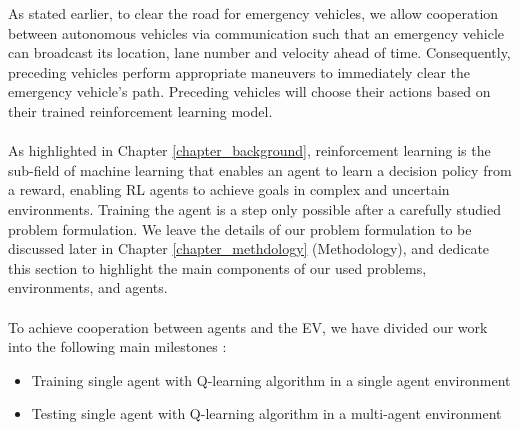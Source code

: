 As stated earlier, to clear the road for emergency vehicles, we  allow cooperation between autonomous vehicles via communication such that an emergency vehicle can broadcast its location, lane number and velocity ahead of time. Consequently, preceding vehicles perform appropriate maneuvers to immediately clear the emergency vehicle's path. Preceding vehicles will choose their actions based on their trained reinforcement learning model.\\ \\
As highlighted in  Chapter \ref{chapter_background}, reinforcement learning is the sub-field of machine learning that enables an agent to learn a decision policy from a reward, enabling  RL agents to achieve goals in complex and uncertain environments. Training the agent is a step only possible after a carefully studied problem formulation. We leave the details of our problem formulation to be discussed later in Chapter \ref{chapter_methdology} (Methodology), and dedicate this section to highlight the main components of our used problems, environments, and agents.
\\ \\
To achieve cooperation between agents and the EV, we have divided our work into the following main milestones :
\begin {itemize}
\item Training single agent with Q-learning algorithm in a single agent environment
\item Testing single agent with Q-learning algorithm in a multi-agent environment 
\end{itemize}

